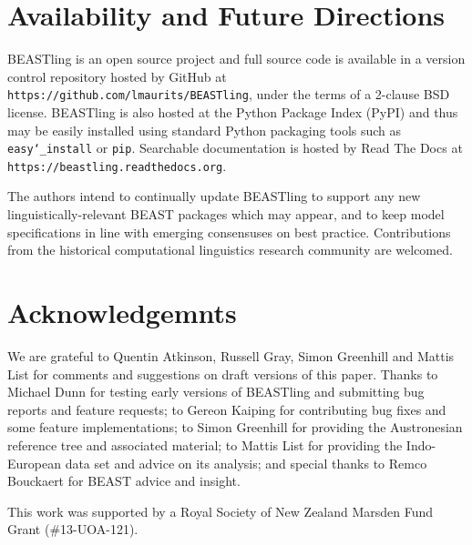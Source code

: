 \documentclass[twocolumn,10pt]{scrartcl}
\begin{document}
\section{Availability and Future Directions}

BEASTling is an open source project and full source code is available in a version control repository hosted by GitHub at \texttt{https://github.com/lmaurits/BEASTling}, under the terms of a 2-clause BSD license.  BEASTling is also hosted at the Python Package Index (PyPI) and thus may be easily installed using standard Python packaging tools such as \texttt{easy\char`_install} or \texttt{pip}.  Searchable documentation is hosted by Read The Docs at \texttt{https://beastling.readthedocs.org}.

The authors intend to continually update BEASTling to support any new linguistically-relevant BEAST packages which may appear, and to keep model specifications in line with emerging consensuses on best practice.  Contributions from the historical computational linguistics research community are welcomed.

\section{Acknowledgemnts}

We are grateful to Quentin Atkinson, Russell Gray, Simon Greenhill and Mattis List for comments and suggestions on draft versions of this paper.  Thanks to Michael Dunn for testing early versions of BEASTling and submitting bug reports and feature requests; to Gereon Kaiping for contributing bug fixes and some feature implementations; to Simon Greenhill for providing the Austronesian reference tree and associated material; to Mattis List for providing the Indo-European data set and advice on its analysis; and special thanks to Remco Bouckaert for BEAST advice and insight.

This work was supported by a Royal Society of New Zealand Marsden Fund Grant (\#13-UOA-121).




\end{document}
